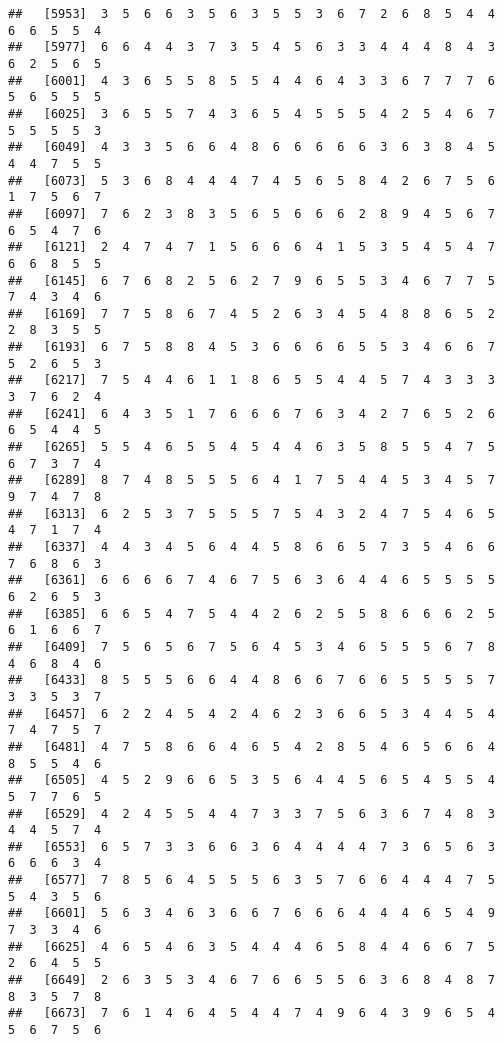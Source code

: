 \documentclass[
]{book}
\begin{document}
\begin{verbatim}
##   [5953]  3  5  6  6  3  5  6  3  5  5  3  6  7  2  6  8  5  4  4  6  6  5  5  4
##   [5977]  6  6  4  4  3  7  3  5  4  5  6  3  3  4  4  4  8  4  3  6  2  5  6  5
##   [6001]  4  3  6  5  5  8  5  5  4  4  6  4  3  3  6  7  7  7  6  5  6  5  5  5
##   [6025]  3  6  5  5  7  4  3  6  5  4  5  5  5  4  2  5  4  6  7  5  5  5  5  3
##   [6049]  4  3  3  5  6  6  4  8  6  6  6  6  6  3  6  3  8  4  5  4  4  7  5  5
##   [6073]  5  3  6  8  4  4  4  7  4  5  6  5  8  4  2  6  7  5  6  1  7  5  6  7
##   [6097]  7  6  2  3  8  3  5  6  5  6  6  6  2  8  9  4  5  6  7  6  5  4  7  6
##   [6121]  2  4  7  4  7  1  5  6  6  6  4  1  5  3  5  4  5  4  7  6  6  8  5  5
##   [6145]  6  7  6  8  2  5  6  2  7  9  6  5  5  3  4  6  7  7  5  7  4  3  4  6
##   [6169]  7  7  5  8  6  7  4  5  2  6  3  4  5  4  8  8  6  5  2  2  8  3  5  5
##   [6193]  6  7  5  8  8  4  5  3  6  6  6  6  5  5  3  4  6  6  7  5  2  6  5  3
##   [6217]  7  5  4  4  6  1  1  8  6  5  5  4  4  5  7  4  3  3  3  3  7  6  2  4
##   [6241]  6  4  3  5  1  7  6  6  6  7  6  3  4  2  7  6  5  2  6  6  5  4  4  5
##   [6265]  5  5  4  6  5  5  4  5  4  4  6  3  5  8  5  5  4  7  5  6  7  3  7  4
##   [6289]  8  7  4  8  5  5  5  6  4  1  7  5  4  4  5  3  4  5  7  9  7  4  7  8
##   [6313]  6  2  5  3  7  5  5  5  7  5  4  3  2  4  7  5  4  6  5  4  7  1  7  4
##   [6337]  4  4  3  4  5  6  4  4  5  8  6  6  5  7  3  5  4  6  6  7  6  8  6  3
##   [6361]  6  6  6  6  7  4  6  7  5  6  3  6  4  4  6  5  5  5  5  6  2  6  5  3
##   [6385]  6  6  5  4  7  5  4  4  2  6  2  5  5  8  6  6  6  2  5  6  1  6  6  7
##   [6409]  7  5  6  5  6  7  5  6  4  5  3  4  6  5  5  5  6  7  8  4  6  8  4  6
##   [6433]  8  5  5  5  6  6  4  4  8  6  6  7  6  6  5  5  5  5  7  3  3  5  3  7
##   [6457]  6  2  2  4  5  4  2  4  6  2  3  6  6  5  3  4  4  5  4  7  4  7  5  7
##   [6481]  4  7  5  8  6  6  4  6  5  4  2  8  5  4  6  5  6  6  4  8  5  5  4  6
##   [6505]  4  5  2  9  6  6  5  3  5  6  4  4  5  6  5  4  5  5  4  5  7  7  6  5
##   [6529]  4  2  4  5  5  4  4  7  3  3  7  5  6  3  6  7  4  8  3  4  4  5  7  4
##   [6553]  6  5  7  3  3  6  6  3  6  4  4  4  4  7  3  6  5  6  3  6  6  6  3  4
##   [6577]  7  8  5  6  4  5  5  5  6  3  5  7  6  6  4  4  4  7  5  5  4  3  5  6
##   [6601]  5  6  3  4  6  3  6  6  7  6  6  6  4  4  4  6  5  4  9  7  3  3  4  6
##   [6625]  4  6  5  4  6  3  5  4  4  4  6  5  8  4  4  6  6  7  5  2  6  4  5  5
##   [6649]  2  6  3  5  3  4  6  7  6  6  5  5  6  3  6  8  4  8  7  8  3  5  7  8
##   [6673]  7  6  1  4  6  4  5  4  4  7  4  9  6  4  3  9  6  5  4  5  6  7  5  6

\end{verbatim}
\end{document}
